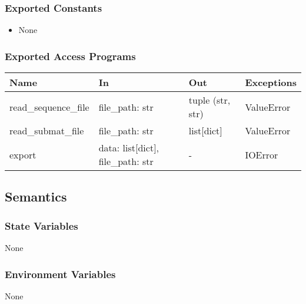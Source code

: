 \documentclass[12pt, titlepage]{article}
\begin{document}
\subsubsection{Exported Constants}

\begin{itemize}
    \item None
\end{itemize}

\subsubsection{Exported Access Programs}

\begin{center}
\begin{tabular}{p{4cm} p{4cm} p{3cm} p{2cm}}
\hline
\textbf{Name} & \textbf{In} & \textbf{Out} & \textbf{Exceptions} \\
\hline
read\_sequence\_file & file\_path: str & tuple (str, str) & ValueError \\
read\_submat\_file & file\_path: str & list[dict] & ValueError \\
export & data: list[dict], file\_path: str & - & IOError \\
\hline
\end{tabular}
\end{center}

\subsection{Semantics}

\subsubsection{State Variables}

None

\subsubsection{Environment Variables}

None


\end{document}
